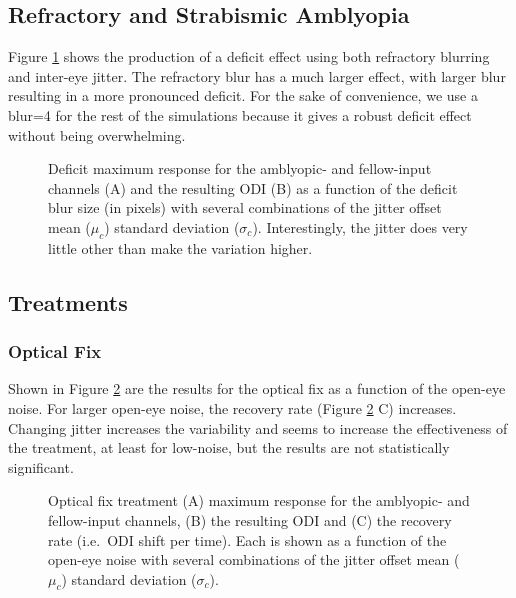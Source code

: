 \documentclass[
  onecolumn]{article}
\begin{document}
\hypertarget{refractory-and-strabismic-amblyopia}{%
\subsection{Refractory and Strabismic
Amblyopia}\label{refractory-and-strabismic-amblyopia}}

Figure \ref{fig:deficit} shows the production of a deficit effect using
both refractory blurring and inter-eye jitter. The refractory blur has a
much larger effect, with larger blur resulting in a more pronounced
deficit. For the sake of convenience, we use a blur=4 for the rest of
the simulations because it gives a robust deficit effect without being
overwhelming.

\begin{figure}
\hypertarget{fig:deficit}{%
\centering

\caption{Deficit maximum response for the amblyopic- and fellow-input
channels (A) and the resulting ODI (B) as a function of the deficit blur
size (in pixels) with several combinations of the jitter offset mean
(\(\mu_c\)) standard deviation (\(\sigma_c\)). Interestingly, the jitter
does very little other than make the variation
higher.}\label{fig:deficit}
}
\end{figure}

\hypertarget{treatments}{%
\subsection{Treatments}\label{treatments}}

\hypertarget{optical-fix-1}{%
\subsubsection{Optical Fix}\label{optical-fix-1}}

Shown in Figure \ref{fig:fix-response-ODI-blur} are the results for the
optical fix as a function of the open-eye noise. For larger open-eye
noise, the recovery rate (Figure \ref{fig:fix-response-ODI-blur} C)
increases. Changing jitter increases the variability and seems to
increase the effectiveness of the treatment, at least for low-noise, but
the results are not statistically significant.

\begin{figure}
\hypertarget{fig:fix-response-ODI-blur}{%
\centering

\caption{Optical fix treatment (A) maximum response for the amblyopic-
and fellow-input channels, (B) the resulting ODI and (C) the recovery
rate (i.e.~ODI shift per time). Each is shown as a function of the
open-eye noise with several combinations of the jitter offset mean
(\(\mu_c\)) standard deviation
(\(\sigma_c\)).}\label{fig:fix-response-ODI-blur}
}
\end{figure}
\end{document}
